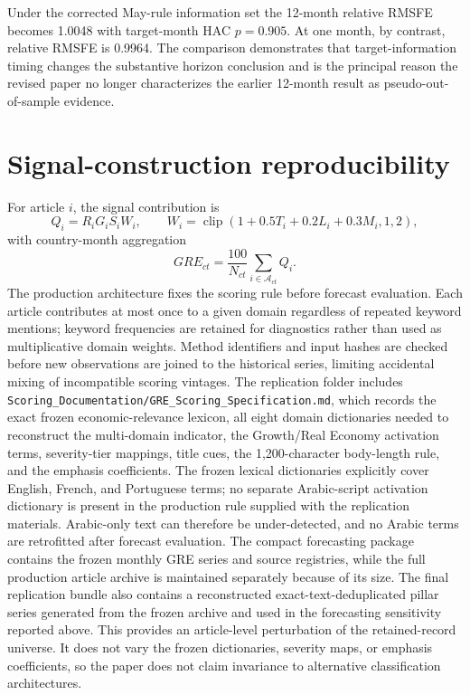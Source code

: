 \documentclass[12pt]{article}
\begin{document}
Under the corrected May-rule information set the 12-month relative RMSFE becomes 1.0048 with target-month HAC $p=0.905$. At one month, by contrast, relative RMSFE is 0.9964. The comparison demonstrates that target-information timing changes the substantive horizon conclusion and is the principal reason the revised paper no longer characterizes the earlier 12-month result as pseudo-out-of-sample evidence.

\section{Signal-construction reproducibility}
For article $i$, the signal contribution is
\[
Q_i=R_iG_iS_iW_i,
\qquad
W_i=\operatorname{clip}(1+0.5T_i+0.2L_i+0.3M_i,1,2),
\]
with country-month aggregation
\[
GRE_{ct}=\frac{100}{N_{ct}}\sum_{i\in\mathcal A_{ct}}Q_i.
\]
The production architecture fixes the scoring rule before forecast evaluation. Each article contributes at most once to a given domain regardless of repeated keyword mentions; keyword frequencies are retained for diagnostics rather than used as multiplicative domain weights. Method identifiers and input hashes are checked before new observations are joined to the historical series, limiting accidental mixing of incompatible scoring vintages. The replication folder includes \texttt{Scoring\_Documentation/GRE\_Scoring\_Specification.md}, which records the exact frozen economic-relevance lexicon, all eight domain dictionaries needed to reconstruct the multi-domain indicator, the Growth/Real Economy activation terms, severity-tier mappings, title cues, the 1,200-character body-length rule, and the emphasis coefficients. The frozen lexical dictionaries explicitly cover English, French, and Portuguese terms; no separate Arabic-script activation dictionary is present in the production rule supplied with the replication materials. Arabic-only text can therefore be under-detected, and no Arabic terms are retrofitted after forecast evaluation. The compact forecasting package contains the frozen monthly GRE series and source registries, while the full production article archive is maintained separately because of its size. The final replication bundle also contains a reconstructed exact-text-deduplicated pillar series generated from the frozen archive and used in the forecasting sensitivity reported above. This provides an article-level perturbation of the retained-record universe. It does not vary the frozen dictionaries, severity maps, or emphasis coefficients, so the paper does not claim invariance to alternative classification architectures.
\end{document}
